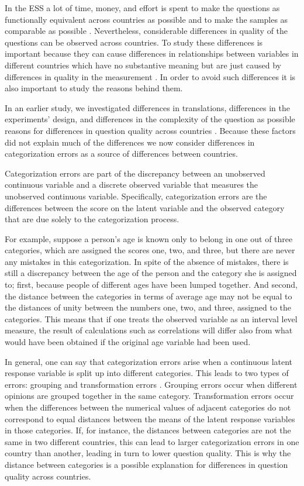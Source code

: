 \documentclass[a4paper,12pt]{article}
\begin{document}
In the ESS a lot of time, money, and effort is spent to make the questions as functionally equivalent across countries as possible \citep{harkness_cross-cultural_2002} and to make the samples as comparable as possible \citep{hader_2007}\nocite{jowell_measuring_2007}. Nevertheless, considerable differences in quality of the questions can be observed across countries. To study these differences is important because they can cause differences in relationships between variables in different countries which have no substantive meaning but are just caused by differences in quality in the measurement \citep{Saris_design_2007}. In order to avoid such differences it is also important to study the reasons behind them.

In an earlier study, we investigated differences in translations, differences in the experiments' design, and differences in the complexity of the question as possible reasons for differences in question quality across countries \citep*{oberski_differences_}. Because these factors did not explain much of the differences we now consider differences in categorization errors as a source of differences between countries. 

Categorization errors are part of the discrepancy between an unobserved continuous variable and a discrete observed variable that measures the unobserved continuous variable. Specifically, categorization errors are the differences between the score on the latent variable and the observed category that are due solely to the categorization process. 

For example, suppose a person's age is known only to belong in one out of three categories, which are assigned the scores one, two, and three, but there are never any mistakes in this categorization. In spite of the absence of mistakes, there is still a discrepancy between the age of the person and the category she is assigned to; first, because people of different ages have been lumped together.  And second, the distance between the categories in terms of average age may not be equal to the distances of unity between the numbers one, two, and three, assigned to the categories. This means that if one treats the observed variable as an interval level measure, the result of calculations such as correlations will differ also from what would have been obtained if the original age variable had been used. 

In general, one can say that categorization errors arise when a continuous latent response variable is split up into different categories. This leads to two types of errors: grouping and transformation errors \citep{johnson_ordinal_1983}. Grouping errors occur when different opinions are grouped together in the same category. Transformation errors occur when the differences between the numerical values of adjacent categories do not correspond to equal distances between the means of the latent response variables in those categories. If, for instance, the distances between categories are not the same in two different countries, this can lead to larger categorization errors in one country than another, leading in turn to lower question quality. This is why the distance between categories is a possible explanation for differences in question quality across countries.
\end{document}
